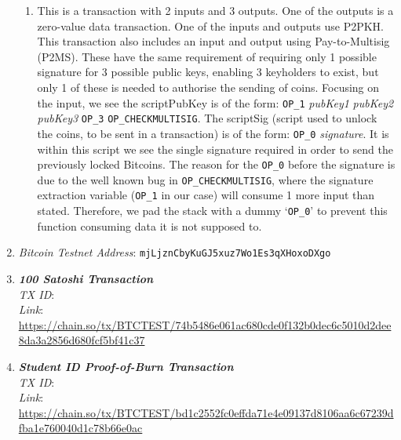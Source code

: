 \documentclass[11pt]{article}
\begin{document}
\begin{enumerate}
\begin{enumerate}
\item This is a transaction with 2 inputs and 3 outputs. One of the outputs is a zero-value data transaction. One of the inputs and outputs use P2PKH. This transaction also includes an input and output using Pay-to-Multisig (P2MS). These have the same requirement of requiring only 1 possible signature for 3 possible public keys, enabling 3 keyholders to exist, but only 1 of these is needed to authorise the sending of coins. Focusing on the input, we see the scriptPubKey is of the form: \texttt{OP\_1} \textit{pubKey1} \textit{pubKey2} \textit{pubKey3} \texttt{OP\_3} \texttt{OP\_CHECKMULTISIG}. The scriptSig (script used to unlock the coins, to be sent in a transaction) is of the form: \texttt{OP\_0} \textit{signature}. It is within this script we see the single signature required in order to send the previously locked Bitcoins. The reason for the \texttt{OP\_0} before the signature is due to the well known bug in \texttt{OP\_CHECKMULTISIG}, where the signature extraction variable (\texttt{OP\_1} in our case) will consume 1 more input than stated. Therefore, we pad the stack with a dummy `\texttt{OP\_0}' to prevent this function consuming data it is not supposed to.

\end{enumerate}

\item \textit{Bitcoin Testnet Address}: \texttt{mjLjznCbyKuGJ5xuz7Wo1Es3qXHoxoDXgo}

\item \textbf{\textit{100 Satoshi Transaction}}\\
\textit{TX ID}: \texttt{}\\
\textit{Link}: \url{https://chain.so/tx/BTCTEST/74b5486e061ac680cde0f132b0dec6c5010d2dee8da3a2856d680fcf5bf41c37}

\item \textbf{\textit{Student ID Proof-of-Burn Transaction}}\\
\textit{TX ID}: \texttt{}\\
\textit{Link}: \url{https://chain.so/tx/BTCTEST/bd1c2552fc0effda71e4e09137d8106aa6c67239dfba1e760040d1c78b66e0ac}


\end{enumerate}
\end{document}
